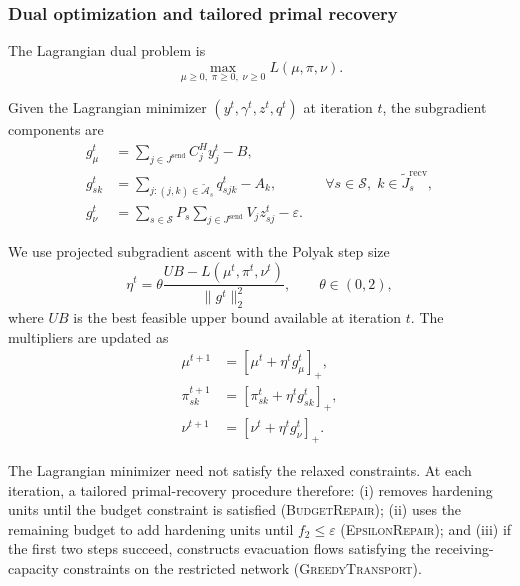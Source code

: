 \documentclass[preprint,11pt,authoryear]{elsarticle}
\begin{document}
\subsubsection{Dual optimization and tailored primal recovery}
\label{sec:ld_dual_recovery}

The Lagrangian dual problem is
\[
\max_{\mu\geq0,\;\pi\geq0,\;\nu\geq0}
L(\mu,\pi,\nu).
\]

Given the Lagrangian minimizer
$(y^t,\gamma^t,z^t,q^t)$ at iteration $t$, the subgradient components are
\begin{align*}
g_\mu^t
&=
\sum_{j\in J^{\mathrm{send}}}C_j^Hy_j^t-B,
\\
g_{sk}^t
&=
\sum_{j:(j,k)\in\widetilde{\mathcal A}_s}
q_{sjk}^t-A_k,
&&
\forall s\in\mathcal S,\;
k\in\widetilde J_s^{\mathrm{recv}},
\\
g_\nu^t
&=
\sum_{s\in\mathcal S}P_s
\sum_{j\in J^{\mathrm{send}}}V_jz_{sj}^t
-\varepsilon.
\end{align*}

We use projected subgradient ascent with the Polyak step size
\[
\eta^t
=
\theta
\frac{UB-L(\mu^t,\pi^t,\nu^t)}
{\lVert g^t\rVert_2^2},
\qquad
\theta\in(0,2),
\]
where $UB$ is the best feasible upper bound available at iteration $t$.
The multipliers are updated as
\begin{align*}
\mu^{t+1}
&=
[\mu^t+\eta^tg_\mu^t]_+,
\\
\pi_{sk}^{t+1}
&=
[\pi_{sk}^t+\eta^tg_{sk}^t]_+,
\\
\nu^{t+1}
&=
[\nu^t+\eta^tg_\nu^t]_+.
\end{align*}

The Lagrangian minimizer need not satisfy the relaxed constraints. At each
iteration, a tailored primal-recovery procedure therefore:
(i) removes hardening units until the budget constraint is satisfied
(\textsc{BudgetRepair});
(ii) uses the remaining budget to add hardening units until
$f_2\leq\varepsilon$ (\textsc{EpsilonRepair}); and
(iii) if the first two steps succeed, constructs evacuation flows satisfying
the receiving-capacity constraints on the restricted network
(\textsc{GreedyTransport}).
\end{document}
